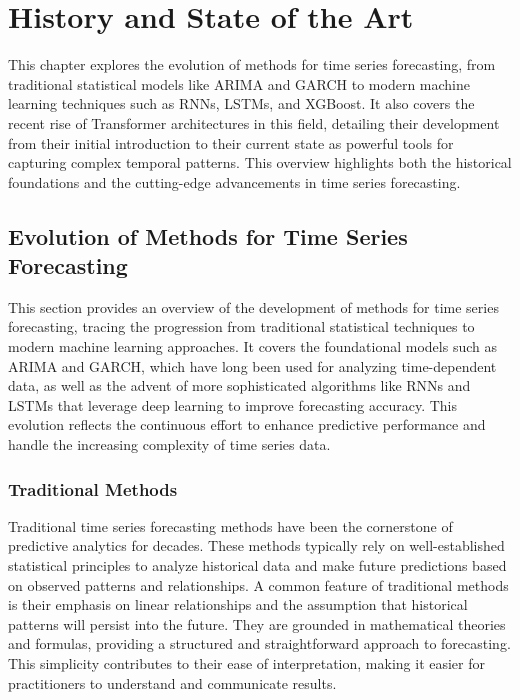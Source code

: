 \chapter{History and State of the Art}
\pagestyle{esitscCD}

This chapter explores the evolution of methods for time series forecasting, from traditional statistical models like ARIMA and GARCH to modern machine learning techniques such as RNNs, LSTMs, and XGBoost. It also covers the recent rise of Transformer architectures in this field, detailing their development from their initial introduction to their current state as powerful tools for capturing complex temporal patterns. This overview highlights both the historical foundations and the cutting-edge advancements in time series forecasting.

\section{Evolution of Methods for Time Series Forecasting}

This section provides an overview of the development of methods for time series forecasting, tracing the progression from traditional statistical techniques to modern machine learning approaches. It covers the foundational models such as ARIMA and GARCH, which have long been used for analyzing time-dependent data, as well as the advent of more sophisticated algorithms like RNNs and LSTMs that leverage deep learning to improve forecasting accuracy. This evolution reflects the continuous effort to enhance predictive performance and handle the increasing complexity of time series data.

\subsection{Traditional Methods}

Traditional time series forecasting methods have been the cornerstone of predictive analytics for decades. These methods typically rely on well-established statistical principles to analyze historical data and make future predictions based on observed patterns and relationships. A common feature of traditional methods is their emphasis on linear relationships and the assumption that historical patterns will persist into the future. They are grounded in mathematical theories and formulas, providing a structured and straightforward approach to forecasting. This simplicity contributes to their ease of interpretation, making it easier for practitioners to understand and communicate results.

